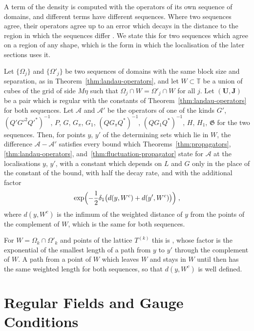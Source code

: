 \documentclass[11pt]{preprint}
\numberwithin{equation}{section}
\begin{document}
A term of the density is computed with the operators of its own sequence of domains, and different terms have different sequences. Where two sequences agree, their operators agree up to an error which decays in the distance to the region in which the sequences differ \cite[Theorem~3.14, pp.~426--427]{BalabanPBG}. We state this for two sequences which agree on a region of any shape, which is the form in which the localisation of the later sections uses it.

\begin{theorem}\label{thm:change-of-sequence}
Let $\{ \Omega_j \}$ and $\{ \Omega'_j \}$ be two sequences of domains with the same block size and separation, as in Theorem~\ref{thm:landau-operators}, and let $W \subset \mathbb T$ be a union of cubes of the grid of side $M\eta$ such that $\Omega_j \cap W = \Omega'_j \cap W$ for all $j$. Let $(\mathbf U, \mathbf J)$ be a pair which is regular with the constants of Theorem~\ref{thm:landau-operators} for both sequences. Let $\mathcal A$ and $\mathcal A'$ be the operators of one of the kinds $G'$, $(Q'G'^2Q'^*)^{-1}$, $P$, $G$, $G_\pi$, $G_1$, $(QG_\pi Q^*)^{-1}$, $(QG_1Q^*)^{-1}$, $H$, $H_1$, $\mathfrak G$ for the two sequences. Then, for points $y$, $y'$ of the determining sets which lie in $W$, the difference $\mathcal A - \mathcal A'$ satisfies every bound which Theorems~\ref{thm:propagators}, \ref{thm:landau-operators}, and~\ref{thm:fluctuation-propagator} state for $\mathcal A$ at the localisations $y$, $y'$, with a constant which depends on $L$ and $G$ only in the place of the constant of the bound, with half the decay rate, and with the additional factor
\begin{equation}\label{eq:change-of-sequence}
    \exp\Bigl(-\frac{1}{2}\delta_1\bigl(d(y, W^c) + d(y', W^c)\bigr)\Bigr)\;,
\end{equation}
where $d(y, W^c)$ is the infimum of the weighted distance of $y$ from the points of the complement of $W$, which is the same for both sequences.
\end{theorem}

For $W = \Omega_k \cap \Omega'_k$ and points of the lattice $T^{(k)}$ this is \cite[Theorem~3.14]{BalabanPBG}, whose factor \cite[(3.154)]{BalabanPBG} is the exponential of the smallest length of a path from $y$ to $y'$ through the complement of $W$. A path from a point of $W$ which leaves $W$ and stays in $W$ until then has the same weighted length for both sequences, so that $d(y, W^c)$ is well defined.

\section{Regular Fields and Gauge Conditions}\label{sec:gauges}
\end{document}
